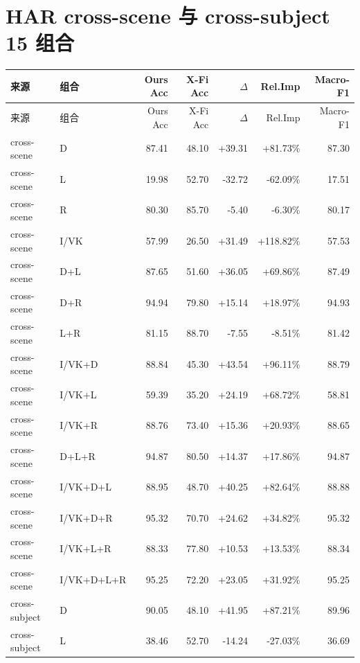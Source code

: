 \documentclass[UTF8,10pt,a4paper]{ctexart}
\newcommand{\better}[1]{\textcolor{ImpBlue}{#1}}
\newcommand{\worse}[1]{\textcolor{DropRed}{#1}}
\begin{document}
\section{HAR cross-scene 与 cross-subject 15 组合}
{\tiny
\begin{longtable}{llrrrrr}
\toprule
来源 & 组合 & Ours Acc & X-Fi Acc & $\Delta$ & Rel.Imp & Macro-F1\\
\midrule
\endfirsthead
\toprule
来源 & 组合 & Ours Acc & X-Fi Acc & $\Delta$ & Rel.Imp & Macro-F1\\
\midrule
\endhead
cross-scene & D & 87.41 & 48.10 & \better{+39.31} & \better{+81.73\%} & 87.30\\
cross-scene & L & 19.98 & 52.70 & \worse{-32.72} & \worse{-62.09\%} & 17.51\\
cross-scene & R & 80.30 & 85.70 & \worse{-5.40} & \worse{-6.30\%} & 80.17\\
cross-scene & I/VK & 57.99 & 26.50 & \better{+31.49} & \better{+118.82\%} & 57.53\\
cross-scene & D+L & 87.65 & 51.60 & \better{+36.05} & \better{+69.86\%} & 87.49\\
cross-scene & D+R & 94.94 & 79.80 & \better{+15.14} & \better{+18.97\%} & 94.93\\
cross-scene & L+R & 81.15 & 88.70 & \worse{-7.55} & \worse{-8.51\%} & 81.42\\
cross-scene & I/VK+D & 88.84 & 45.30 & \better{+43.54} & \better{+96.11\%} & 88.79\\
cross-scene & I/VK+L & 59.39 & 35.20 & \better{+24.19} & \better{+68.72\%} & 58.81\\
cross-scene & I/VK+R & 88.76 & 73.40 & \better{+15.36} & \better{+20.93\%} & 88.65\\
cross-scene & D+L+R & 94.87 & 80.50 & \better{+14.37} & \better{+17.86\%} & 94.87\\
cross-scene & I/VK+D+L & 88.95 & 48.70 & \better{+40.25} & \better{+82.64\%} & 88.88\\
cross-scene & I/VK+D+R & 95.32 & 70.70 & \better{+24.62} & \better{+34.82\%} & 95.32\\
cross-scene & I/VK+L+R & 88.33 & 77.80 & \better{+10.53} & \better{+13.53\%} & 88.34\\
cross-scene & I/VK+D+L+R & 95.25 & 72.20 & \better{+23.05} & \better{+31.92\%} & 95.25\\
cross-subject & D & 90.05 & 48.10 & \better{+41.95} & \better{+87.21\%} & 89.96\\
cross-subject & L & 38.46 & 52.70 & \worse{-14.24} & \worse{-27.03\%} & 36.69\\

\end{longtable}}
\end{document}
